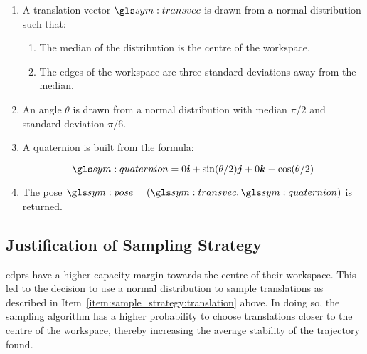 		\begin{enumerate}

			\item

				A translation vector $\transvec$ is drawn from a normal
				distribution such that:
				\label{item:sample_strategy:translation}

				\begin{enumerate}

					\item

						The median of the distribution is the centre of the
						workspace.

					\item

						The edges of the workspace are three standard deviations
						away from the median.
				\end{enumerate}

			\item

				An angle $\theta$ is drawn from a normal distribution with
				median $\pi/2$ and standard deviation $\pi/6$.

				\label{item:sample_strategy:angle}

			\item

				A quaternion is built from the formula:

				\begin{equation}
					\quaternion = 0\vec{i} + \sin(\theta/2)\vec{j} + 0\vec{k} +
						\cos(\theta/2)
				\end{equation}

				\label{item:sample_strategy:quaternion}


			\item

				The pose $\pose = (\transvec, \quaternion)$ is returned.

		\end{enumerate}

		\subsection{Justification of Sampling Strategy}%
		\label{sec:justification_of_sampling_strategy}

			\glspl{cdpr} have a higher capacity margin towards the centre of
			their workspace. This led to the decision
			to use a normal distribution to sample translations as described in
			Item~\ref{item:sample_strategy:translation} above. In doing so,
			the sampling algorithm has a higher probability to choose
			translations closer to the centre of the workspace, thereby
			increasing the average stability of the trajectory found.

